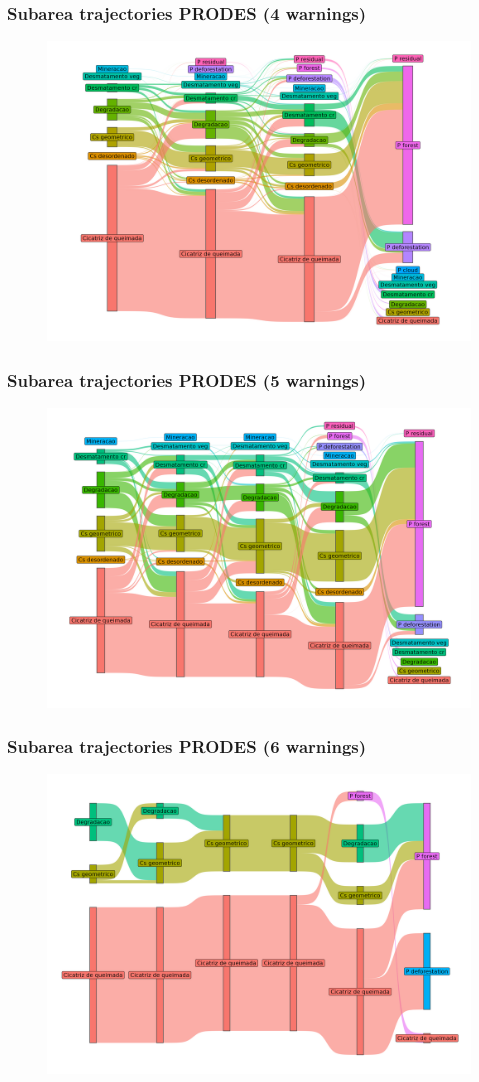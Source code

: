 \documentclass[aspectratio=169]{beamer}
\begin{document}
\begin{frame}
    \frametitle{Subarea trajectories PRODES (4 warnings)}
    \begin{figure}[h]
        \includegraphics[width=0.75\linewidth]
        {./figures/plot_deter_prodes_subarea_trajectory_4.png}
    \end{figure}
\end{frame}

\begin{frame}
    \frametitle{Subarea trajectories PRODES (5 warnings)}
    \begin{figure}[h]
        \includegraphics[width=0.75\linewidth]
        {./figures/plot_deter_prodes_subarea_trajectory_5.png}
    \end{figure}
\end{frame}

\begin{frame}
    \frametitle{Subarea trajectories PRODES (6 warnings)}
    \begin{figure}[h]
        \includegraphics[width=0.75\linewidth]
        {./figures/plot_deter_prodes_subarea_trajectory_6.png}
    \end{figure}
\end{frame}
\end{document}

